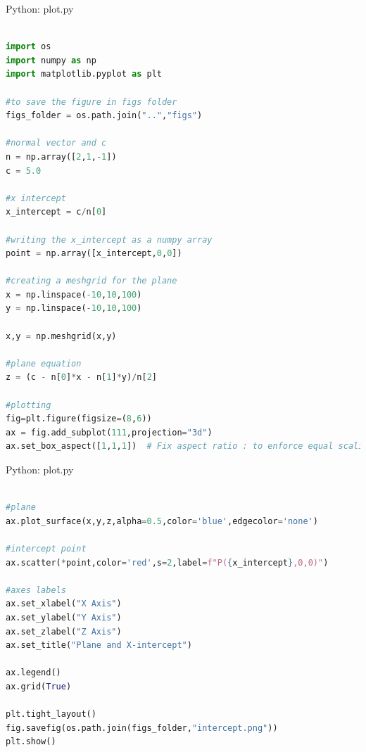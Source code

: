 \documentclass{beamer}
\numberwithin{equation}{section}
\theoremstyle{remark}
\begin{document}
\begin{frame}[fragile]{Python: plot.py}
\begin{lstlisting}[language=Python]

import os
import numpy as np 
import matplotlib.pyplot as plt 

#to save the figure in figs folder
figs_folder = os.path.join("..","figs")

#normal vector and c 
n = np.array([2,1,-1])
c = 5.0

#x intercept
x_intercept = c/n[0]

#writing the x_intercept as a numpy array 
point = np.array([x_intercept,0,0])

#creating a meshgrid for the plane
x = np.linspace(-10,10,100)
y = np.linspace(-10,10,100)

x,y = np.meshgrid(x,y)

#plane equation
z = (c - n[0]*x - n[1]*y)/n[2]

#plotting
fig=plt.figure(figsize=(8,6))
ax = fig.add_subplot(111,projection="3d")
ax.set_box_aspect([1,1,1])  # Fix aspect ratio : to enforce equal scaling across axes so that xintercept lies on x axis.

\end{lstlisting}
\end{frame}

\begin{frame}[fragile]{Python: plot.py}
\begin{lstlisting}[language=Python]

#plane
ax.plot_surface(x,y,z,alpha=0.5,color='blue',edgecolor='none')

#intercept point
ax.scatter(*point,color='red',s=2,label=f"P({x_intercept},0,0)")

#axes labels 
ax.set_xlabel("X Axis")
ax.set_ylabel("Y Axis")
ax.set_zlabel("Z Axis")
ax.set_title("Plane and X-intercept")

ax.legend()
ax.grid(True)

plt.tight_layout()
fig.savefig(os.path.join(figs_folder,"intercept.png"))
plt.show()

\end{lstlisting}
\end{frame}
\end{document}
